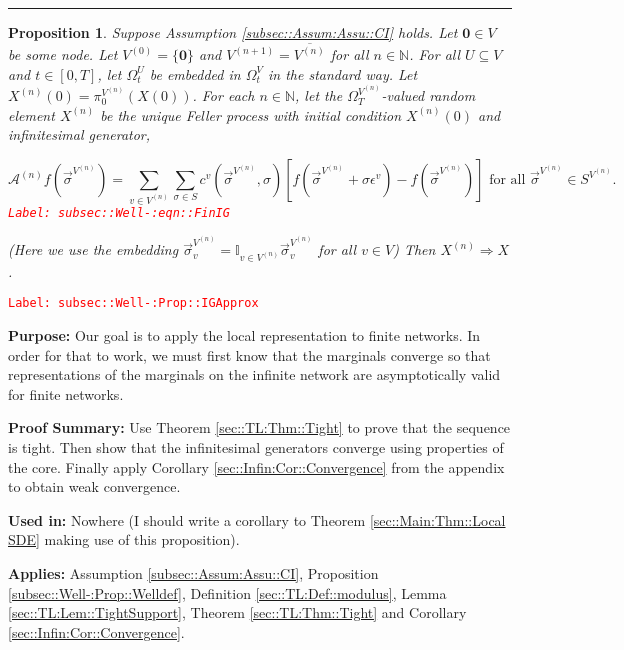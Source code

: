 \documentclass[12pt]{article}
\newcommand{\mb}{\mathbb}
\newcommand{\mc}{\mathcal}
\newcommand{\ov}{\overline}
\newcommand{\te}{\text}
\newcommand{\ep}{\epsilon}
\newcommand{\tr}{\textcolor{red}}
\newcommand{\labe}[1]{\tr{\texttt{Label: #1}}}
\newcommand{\purpose}{\textbf{Purpose: }}
\newcommand{\pfsum}{\textbf{Proof Summary: }}
\newcommand{\usein}{\textbf{Used in: }}
\newcommand{\app}{\textbf{Applies: }}
\newcommand{\lin}{\rule{\linewidth}{0.4 pt}}
\renewcommand{\root}{\mathbf{0}}				%
\renewcommand{\v}{v}							%
\renewcommand{\U}{U}							%
\renewcommand{\S}{S}							%
\newcommand{\s}{\sigma}							%
\newcommand{\sv}{\vec{\s}}						%
\newcommand{\ev}{\ep}							%
\newcommand{\T}{T}								%
\renewcommand{\t}{t}							%
\newcommand{\sset}{\Omega}						%
\newcommand{\proj}{\pi}							%
\newcommand{\X}{X}								%
\newcommand{\IG}{\mc{A}}						%
\newcommand{\IGr}{c}							%
\newcommand{\vind}[1]{^{#1}}					%
\newcommand{\carp}[1]{^{#1}}					%
\newcommand{\vsi}[1]{^{#1}}						%
\newcommand{\cind}[1]{_{#1}}					%
\newcommand{\cl}{\ov}							%
\newcommand{\tp}[1]{(#1)}						%
\newcommand{\ts}[1]{_{#1}}						%
\newcommand{\sln}[1]{^{(#1)}}					%
\newtheorem{prop}[thms]{Proposition}
\begin{document}
\lin

\begin{prop}
Suppose Assumption \ref{subsec::Assum:Assu::CI} holds. Let \(\root \in V\) be some node. Let \(V\sln{0} = \{\root\}\) and \(V\sln{n+1} = \cl{V\sln{n}}\) for all \(n \in \mb{N}\). For all \(\U \subseteq V\) and \(\t \in [0,\T]\), let \(\sset\vsi{\U}\ts{\t}\) be embedded in \(\sset\vsi{V}\ts{\t}\) in the standard way. Let \(\X\sln{n}\tp{0} = \proj\vsi{V\sln{n}}\ts{0}(\X\tp{0})\). For each \(n\in\mb{N}\), let the \(\sset\vsi{V\sln{n}}\ts{\T}\)-valued random element \(\X\sln{n}\) be the unique Feller process with initial condition \(\X\sln{n}\tp{0}\) and infinitesimal generator,

\begin{equation}
\IG\sln{n}f(\sv\vsi{V\sln{n}}) = \sum_{\v\in V\sln{n}}\sum_{\s\in \S} \IGr\vind{\v}(\sv\vsi{V\sln{n}}, \s)[f(\sv\vsi{V\sln{n}} + \s\ev\vind{\v}) - f(\sv\vsi{V\sln{n}})]\te{ for all } \sv\vsi{V\sln{n}} \in \S\carp{V\sln{n}}.
\label{subsec::Well-:eqn::FinIG}
\end{equation}
\labe{subsec::Well-:eqn::FinIG}

(Here we use the embedding \(\sv\cind{\v}\vsi{V\sln{n}} = \mb{I}_{\v\in V\sln{n}} \sv\cind{\v}\vsi{V\sln{n}}\) for all \(\v \in V\)) Then \(\X\sln{n} \Rightarrow \X\).
\label{subsec::Well-:Prop::IGApprox}
\end{prop}
\labe{subsec::Well-:Prop::IGApprox}

\purpose Our goal is to apply the local representation to finite networks. In order for that to work, we must first know that the marginals converge so that representations of the marginals on the infinite network are asymptotically valid for finite networks.

\pfsum Use Theorem \ref{sec::TL:Thm::Tight} to prove that the sequence is tight. Then show that the infinitesimal generators converge using properties of the core. Finally apply Corollary \ref{sec::Infin:Cor::Convergence} from the appendix to obtain weak convergence.

\usein Nowhere (I should write a corollary to Theorem \ref{sec::Main:Thm::Local SDE} making use of this proposition).

\app Assumption \ref{subsec::Assum:Assu::CI}, Proposition \ref{subsec::Well-:Prop::Welldef}, Definition \ref{sec::TL:Def::modulus}, Lemma \ref{sec::TL:Lem::TightSupport}, Theorem \ref{sec::TL:Thm::Tight} and Corollary \ref{sec::Infin:Cor::Convergence}.
\end{document}
